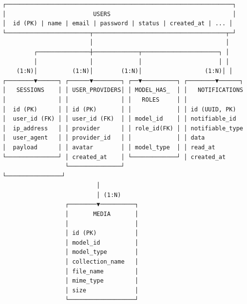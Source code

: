 \documentclass[12pt,a4paper]{article}
\begin{document}
\begin{verbatim}
┌─────────────────────────────────────────────────────────────────┐
│                         USERS                                   │
│  id (PK) | name | email | password | status | created_at | ... │
└────────────────────────┬──────────────────────────────────────┬─┘
                         │                                      │
         ┌───────────────┼─────────────┬──────────────────────┐ │
         │               │             │                      │ │
    (1:N)│          (1:N)│        (1:N)│                  (1:N)│ │
┌────────▼──────┐ ┌──────▼────────┐ ┌──▼──────────┐ ┌────────▼──────┐
│   SESSIONS    │ │ USER_PROVIDERS│ │ MODEL_HAS_  │ │   NOTIFICATIONS
│               │ │               │ │   ROLES     │ │
│  id (PK)      │ │ id (PK)       │ │             │ │ id (UUID, PK)
│  user_id (FK) │ │ user_id (FK)  │ │ model_id    │ │ notifiable_id
│  ip_address   │ │ provider      │ │ role_id(FK) │ │ notifiable_type
│  user_agent   │ │ provider_id   │ │             │ │ data
│  payload      │ │ avatar        │ │ model_type  │ │ read_at
└───────────────┘ │ created_at    │ └─────────────┘ │ created_at
                  └───────────────┘                  └────────────────┘
                           │
                           │ (1:N)
                  ┌────────▼──────────┐
                  │       MEDIA       │
                  │                   │
                  │ id (PK)           │
                  │ model_id          │
                  │ model_type        │
                  │ collection_name   │
                  │ file_name         │
                  │ mime_type         │
                  │ size              │
                  └───────────────────┘


\end{verbatim}
\end{document}
